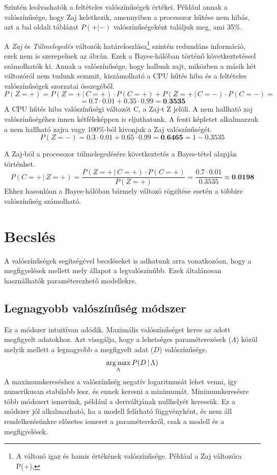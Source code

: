 Szintén leolvashatók a feltételes valószínűségek értékei. Például annak a valószínűsége, hogy Zaj keletkezik, amennyiben a processzor hűtése nem hibás, azt a bal oldali táblázat $P(+|-)$ valószínűségeként találjuk meg, ami 35\%.

A \emph{Zaj} és \emph{Túlmelegedés} változók határeloszlása\footnote{A változó igaz és hamis értékének valószínűsége. Például a Zaj változóra P(+).} szintén redundáns információ, ezek nem is szerepelnek az ábrán. Ezek a Bayes-hálóban történő következtetéssel számolhatók ki. Annak a valószínűsége, hogy hallunk zajt, miközben a másik két változóról nem tudunk semmit, kiszámolható a CPU hűtés hiba és a feltételes valószínűségek szorzatai összegéből.
$$P(Z=+) = P(Z=+\,|\,C=+) \cdot P(C=+) + P(Z=+\,|\,C=-) \cdot P(C=-) =$$
$$= 0.7 \cdot 0.01 + 0.35 \cdot 0.99 = \textbf{0.3535} $$
A CPU hűtés hiba valószínűségi változót C, a Zaj-t Z jelöli. A nem hallható zaj valószínűségéhez innen kétféleképpen is eljuthatunk. A fenti képletet alkalmazzuk a nem hallható zajra vagy 100\%-ból kivonjuk a Zaj valószínűségét.
$$P(Z=-) = 0.3 \cdot 0.01 + 0.65 \cdot 0.99 = \textbf{0.6465} = 1-0.3535 $$

A Zaj-ból a processzor túlmelegedésére következtetés a Bayes-tétel alapján történhet.
$$P(C=+\,|\,Z=+) = \frac{P(Z=+\,|\,C=+) \cdot P(C=+)}{P(Z=+)} = \frac{0.7 \cdot 0.01}{0.3535} \approx \textbf{0.0198}$$
Ehhez hasonlóan a Bayes-hálóban bármely változó rögzítése esetén a többire valószínűség számolható.


\section{Becslés}
A valószínűségek segítségével becsléseket is adhatunk arra vonatkozóan, hogy a megfigyelések mellett mely állapot a legvalószínűbb. Ezek általánosan használhatók paraméterezhető modellekre.

\subsection{Legnagyobb valószínűség módszer}
Ez a módszer intuitívan adódik. Maximális valószínűséget keres az adott megfigyelt adatokhoz. Azt vizsgálja, hogy a lehetséges paraméterezések ($\Lambda$) közül melyik mellett a legnagyobb a megfigyelt adat ($D$) valószínűsége.
$$\operatorname*{arg\,max}_{\Lambda}{P(D\,|\,\Lambda)}$$
A maximumkereséshez a valószínűség negatív logaritmusát lehet venni, így numerikusan stabilabb lesz, és ennek keresni a minimumát. Minimumkeresésre több módszert ismerünk, például a deriváltjának nullhelyét keressük. Ez a módszer jól alkalmazható, ha a modell felírható függvényként, és nem áll rendelkezésünkre előzetes ismeret a paraméterekről, csak a modell és a megfigyelések.

